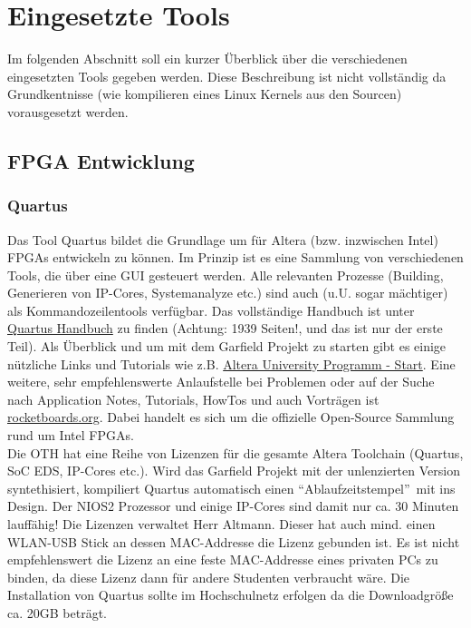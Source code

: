 \section{Eingesetzte Tools}
Im folgenden Abschnitt soll ein kurzer Überblick über die verschiedenen eingesetzten Tools gegeben werden. Diese Beschreibung ist nicht vollständig da Grundkentnisse (wie kompilieren eines Linux Kernels aus den Sourcen) vorausgesetzt werden.

\subsection{FPGA Entwicklung}

\subsubsection{Quartus}
Das Tool Quartus bildet die Grundlage um für Altera (bzw. inzwischen Intel) \acp{FPGA} entwickeln zu können. Im Prinzip ist es eine Sammlung von verschiedenen Tools, die über eine GUI gesteuert werden. Alle relevanten Prozesse (Building, Generieren von IP-Cores, Systemanalyze etc.) sind auch (u.U. sogar mächtiger) als Kommandozeilentools verfügbar. Das vollständige Handbuch ist unter \href{https://www.altera.com/en_US/pdfs/literature/hb/qts/qts-qps-handbook.pdf}{Quartus Handbuch} zu finden (Achtung: 1939 Seiten!, und das ist nur der erste Teil). Als Überblick und um mit dem Garfield Projekt zu starten gibt es einige nützliche Links und Tutorials wie z.B. \href{https://www.altera.com/support/training/university/materials-tutorials.html}{Altera University Programm - Start}. Eine weitere, sehr empfehlenswerte Anlaufstelle bei Problemen oder auf der Suche nach Application Notes, Tutorials, HowTos und auch Vorträgen ist \href{rocketboards.org}{rocketboards.org}. Dabei handelt es sich um die offizielle Open-Source Sammlung rund um Intel \acp{FPGA}.\\

Die OTH hat eine Reihe von Lizenzen für die gesamte Altera Toolchain (Quartus, SoC EDS, IP-Cores etc.). Wird das Garfield Projekt mit der unlenzierten Version syntethisiert, kompiliert Quartus automatisch einen \textquotedblleft Ablaufzeitstempel\textquotedblright~mit ins Design. Der NIOS2 Prozessor und einige \ac{IP}-Cores sind damit nur ca. 30 Minuten lauffähig! Die Lizenzen verwaltet Herr Altmann. Dieser hat auch mind. einen WLAN-USB Stick an dessen MAC-Addresse die Lizenz gebunden ist. Es ist nicht empfehlenswert die Lizenz an eine feste MAC-Addresse eines privaten PCs zu binden, da diese Lizenz dann für andere Studenten verbraucht wäre. Die Installation von Quartus sollte im Hochschulnetz erfolgen da die Downloadgröße ca. 20GB beträgt.

